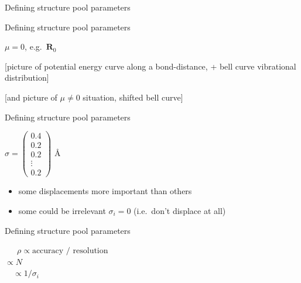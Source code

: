 \documentclass{beamer}
\begin{document}
\begin{frame}{Defining structure pool parameters}
	\begin{center}

	\end{center}
\end{frame}

\begin{frame}{Defining structure pool parameters}
		\begin{center}
	{\huge$\mu=0$, e.g.\ $\textbf{R}_0$}
		\end{center}
	
	[picture of potential energy curve along a bond-distance, + bell curve vibrational distribution]
	
	[and picture of $\mu\neq 0$ situation, shifted bell curve]
\end{frame}

\begin{frame}{Defining structure pool parameters}
		\begin{center}
	$\sigma=\begin{pmatrix}
	0.4 \\
	0.2\\
	0.2\\
	\vdots\\
	0.2
	\end{pmatrix}
	$ \AA
		\end{center}
	
	\begin{itemize}
		\item some displacements more important than others
		\item some could be irrelevant $\sigma_i = 0$ (i.e.\ don't displace at all)
	\end{itemize}

\end{frame}

\begin{frame}{Defining structure pool parameters}
		\begin{center}
	\qquad\qquad\qquad\ \ \ {\huge$\rho\propto\textrm{accuracy / resolution}$}\\
		\vspace{2mm}
	{\huge$\propto N$}\\
		\vspace{2mm}
	\quad\ \ {\huge$\propto 1/\sigma_i$}\\

		\end{center}

\end{frame}
\end{document}
